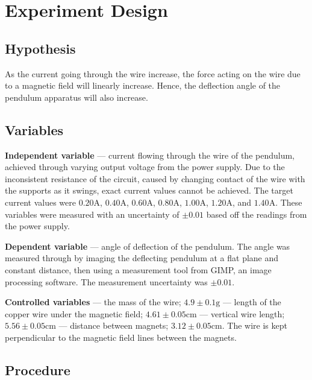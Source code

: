 \section*{Experiment Design}

\subsection*{Hypothesis}

As the current going through the wire increase, the force acting on the wire due to a magnetic field will linearly increase. Hence, the deflection angle of the pendulum apparatus will also increase.

\subsection*{Variables}

\textbf{Independent variable} --- current flowing through the wire of the pendulum, achieved through varying output voltage from the power supply.
Due to the inconsistent resistance of the circuit, caused by changing contact of the wire with the supports as it swings, exact current values cannot be achieved.
The target current values were $0.20\si{\ampere}$, $0.40\si{\ampere}$, $0.60\si{\ampere}$, $0.80\si{\ampere}$, $1.00\si{\ampere}$, $1.20\si{\ampere}$, and $1.40\si{\ampere}$.
These variables were measured with an uncertainty of $\pm0.01$ based off the readings from the power supply.

\textbf{Dependent variable} --- angle of deflection of the pendulum. The angle was measured through by imaging the deflecting pendulum at a flat plane and constant distance, then using a measurement tool from GIMP, an image processing software. The measurement uncertainty was $\pm0.01$.

\textbf{Controlled variables} --- the mass of the wire; $4.9\pm0.1\si{\gram}$ --- length of the copper wire under the magnetic field; $4.61\pm0.05\si{\centi\meter}$ --- vertical wire length; $5.56\pm0.05\si{\centi\meter}$ --- distance between magnets; $3.12\pm0.05\si{\centi\meter}$.
The wire is kept perpendicular to the magnetic field lines between the magnets.

\subsection*{Procedure}

